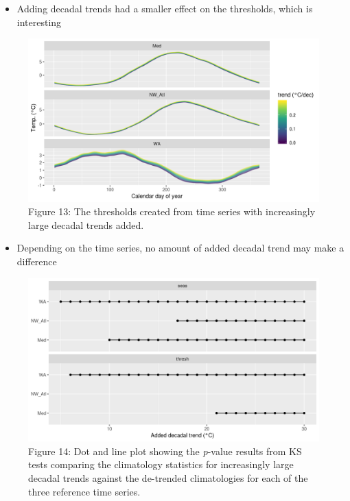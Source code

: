 \documentclass[]{article}
\providecommand{\tightlist}{%
  \setlength{\itemsep}{0pt}\setlength{\parskip}{0pt}}
\begin{document}
\begin{itemize}
\tightlist
\item
  Adding decadal trends had a smaller effect on the thresholds, which is
  interesting
\end{itemize}

\begin{figure}
\centering
\includegraphics{../docs/articles/trend_files/figure-html/clim-trend-thresh-1.png}
\caption{Figure 13: The thresholds created from time series with
increasingly large decadal trends added.}
\end{figure}

\begin{itemize}
\tightlist
\item
  Depending on the time series, no amount of added decadal trend may
  make a difference
\end{itemize}

\begin{figure}
\centering
\includegraphics{../docs/articles/trend_files/figure-html/KS-clims-1.png}
\caption{Figure 14: Dot and line plot showing the \emph{p}-value results
from KS tests comparing the climatology statistics for increasingly
large decadal trends against the de-trended climatologies for each of
the three reference time series.}
\end{figure}
\end{document}
